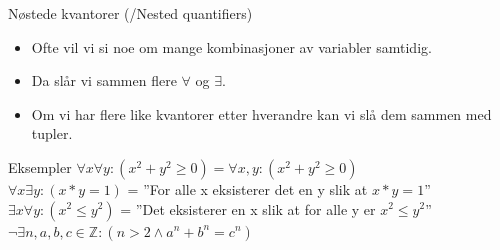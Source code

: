 \begin{frame}{Nøstede kvantorer (/Nested quantifiers)}
    \begin{itemize}
        \item Ofte vil vi si noe om mange kombinasjoner av variabler samtidig.
        \item Da slår vi sammen flere $\forall$ og $\exists$.
        \item Om vi har flere like kvantorer etter hverandre kan vi slå dem sammen med tupler.
    \end{itemize}
    
    \begin{block}{Eksempler}
        $\forall x \forall y : (x^2 + y^2 \geq 0) = \forall x, y : (x^2 + y^2 \geq 0)$ \\
        $\forall x \exists y : (x * y = 1)$ = ''For alle x eksisterer det en y slik at $x * y = 1$'' \\
        $\exists x \forall y : (x^2 \leq y^2)$ = ''Det eksisterer en x slik at for alle y er $x^2 \leq y^2$''\\
        $\lnot \exists n, a, b, c \in \mathbb{Z} : (n > 2 \land a^n + b^n = c^n)$\\
    \end{block}
\end{frame}

